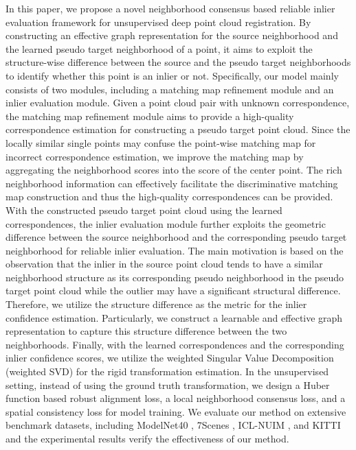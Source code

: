 \documentclass[letterpaper]{article} %
\begin{document}
	In this paper, we propose a novel neighborhood consensus based reliable inlier evaluation framework for unsupervised deep point cloud registration. 
	By constructing an effective graph representation for the source neighborhood and the learned pseudo target neighborhood of a point, it aims to exploit the structure-wise difference between the source and the pseudo target neighborhoods to identify whether this point is an inlier or not. 
	Specifically, our model mainly consists of two modules, including a matching map refinement module and an inlier evaluation module. 
	Given a point cloud pair with unknown correspondence, the matching map refinement module aims to provide a high-quality correspondence estimation for constructing a pseudo target point cloud. 
	Since the locally similar single points may confuse the point-wise matching map for incorrect correspondence estimation, we improve the matching map by aggregating the neighborhood scores into the score of the center point.
	The rich neighborhood information can effectively facilitate the discriminative matching map construction and thus the high-quality correspondences can be provided.
	With the constructed pseudo target point cloud using the learned correspondences, the inlier evaluation module further exploits the geometric difference between the source neighborhood and the corresponding pseudo target neighborhood for reliable inlier evaluation. 
	The main motivation is based on the observation that the inlier in the source point cloud tends to have a similar neighborhood structure as its corresponding pseudo neighborhood in the pseudo target point cloud while the outlier may have a significant structural difference. Therefore, we utilize the structure difference as the metric for the inlier confidence estimation. 
	Particularly, we construct a learnable and effective graph representation to capture this structure difference between the two neighborhoods.
	Finally, with the learned correspondences and the corresponding inlier confidence scores, we utilize the weighted Singular Value Decomposition (weighted SVD) for the rigid transformation estimation.
	In the unsupervised setting, instead of using the ground truth transformation, we design a Huber function based robust alignment loss, a local neighborhood consensus loss, and a spatial consistency loss for model training. 
	We evaluate our method on extensive benchmark datasets, including ModelNet40 \cite{wu20153d}, 7Scenes \cite{shotton2013scene}, ICL-NUIM \cite{choi2015robust}, and KITTI \cite{geiger2012we} and the experimental results verify the effectiveness of our method.
	
\end{document}

